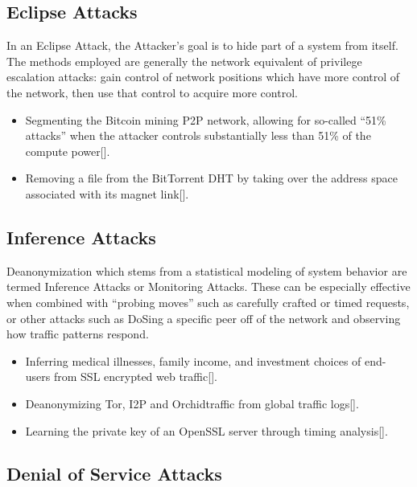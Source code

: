 \documentclass{article}
\newcommand{\orchid}{Orchid}
\newcommand{\Orchid}{\orchid}
\begin{document}
\subsection{Eclipse Attacks}

In an Eclipse Attack, the Attacker's goal is to hide part of a system from itself. The methods employed are generally the network equivalent of privilege escalation attacks: gain control of network positions which have more control of the network, then use that control to acquire more control.

\begin{itemize}
\item Segmenting the Bitcoin mining P2P network, allowing for so-called “51\% attacks” when the attacker controls substantially less than 51\% of the compute power[\cite{bitcoinEclipse}].
\item Removing a file from the BitTorrent DHT by taking over the address space associated with its magnet link[\cite{bittorrentSybilAttacks}].
\end{itemize}

\subsection{Inference Attacks}
\label{inference-attacks}

Deanonymization which stems from a statistical modeling of system behavior are termed Inference Attacks or Monitoring Attacks. These can be especially effective when combined with “probing moves” such as carefully crafted or timed requests, or other attacks such as DoSing a specific peer off of the network and observing how traffic patterns respond.

\begin{itemize}
\item Inferring medical illnesses, family income, and investment choices of end- users from SSL encrypted web traffic[\cite{broadInferenceAttacks}].
\item Deanonymizing Tor, I2P and \Orchid traffic from global traffic logs[\cite{mixTrafficAnalysis}].
\item Learning the private key of an OpenSSL server through timing analysis[\cite{opensslTimingAttack}].
\end{itemize}

\subsection{Denial of Service Attacks}
\end{document}
